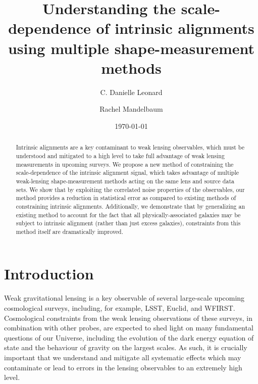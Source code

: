 \documentclass[a4paper,fleqn,usenatbib,useAMS]{mnras}
\begin{document}
\title{{Understanding the scale-dependence of intrinsic alignments using multiple shape-measurement methods}}

\author{C. Danielle Leonard}

\author{Rachel Mandelbaum}

\date{\today}

\begin{abstract}
Intrinsic alignments are a key contaminant to weak lensing observables, which must be understood and mitigated to a high level to take full advantage of weak lensing measurements in upcoming surveys. We propose a new method of constraining the scale-dependence of the intrinsic alignment signal, which takes advantage of multiple weak-lensing shape-measurement methods acting on the same lens and source data sets. We show that by exploiting the correlated noise properties of the observables, our method provides a reduction in statistical error as compared to existing methods of constraining intrinsic alignments. Additionally, we demonstrate that by generalizing an existing method to account for the fact that all physically-associated galaxies may be subject to intrinsic alignment (rather than just excess galaxies), constraints from this method itself are dramatically improved.
\end{abstract}


\maketitle


\section{Introduction}
\label{sec:introduction}
\noindent
Weak gravitational lensing is a key observable of several large-scale upcoming cosmological surveys, including, for example, LSST, Euclid, and WFIRST. Cosmological constraints from the weak lensing observations of these surveys, in combination with other probes, are expected to shed light on many fundamental questions of our Universe, including the evolution of the dark energy equation of state and the behaviour of gravity on the largest scales. As such, it is crucially important that we understand and mitigate all systematic effects which may contaminate or lead to errors in the lensing observables to an extremely high level.
\end{document}
